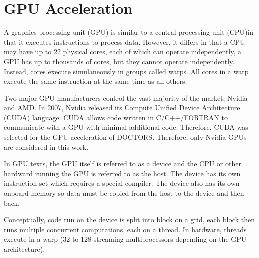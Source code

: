 \section{GPU Acceleration}

A graphics processing unit (GPU) is similar to a central processing unit (CPU)in that it executes instructions to process data. However, it differs in that a CPU may have up to 22 physical cores, each of which can operate independently, a GPU has up to thousands of cores, but they cannot operate independently. Instead, cores execute simulaneously in groups called warps. All cores in a warp execute the same instruction at the same time as all others. 

Two major GPU manufacturers control the vast majority of the market, Nvidia and AMD. In 2007, Nvidia released its Compute Unified Device Architecture (CUDA) language. CUDA allows code written in C/C++/FORTRAN to communicate with a GPU with minimal additional code. Therefore, CUDA was selected for the GPU acceleration of DOCTORS. Therefore, only Nvidia GPUs are considered in this work.

In GPU texts, the GPU itself is referred to as a device and the CPU or other hardward running the GPU is referred to as the host. The device has its own instruction set which requires a special compiler. The device also has its own onboard memory so data must be copied from the host to the device and then back.

Conceptually, code run on the device is split into block on a grid, each block then runs multiple concurrent computations, each on a thread. In hardware, threads execute in a warp (32 to 128 streaming multiprocessors depending on the GPU architecture).


\endinput
